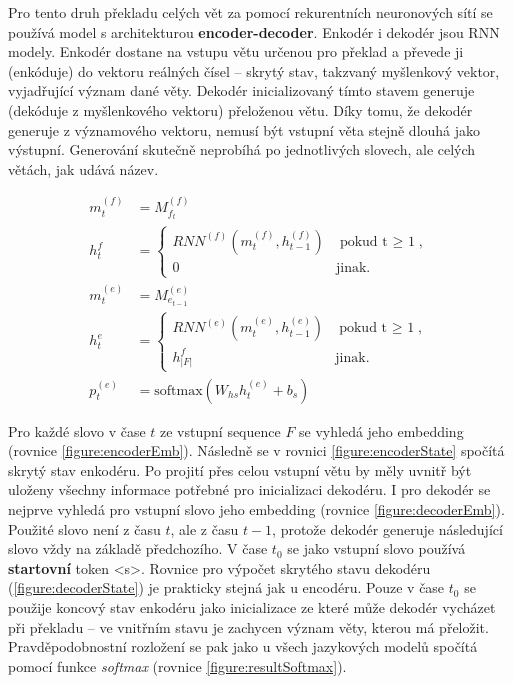 Pro tento druh překladu celých vět za pomocí rekurentních neuronových sítí se používá model s architekturou \textbf{encoder-decoder}. Enkodér i dekodér jsou RNN modely. Enkodér dostane na vstupu větu určenou pro překlad a převede ji (enkóduje) do vektoru reálných čísel -- skrytý stav, takzvaný myšlenkový vektor, vyjadřující význam dané věty. Dekodér inicializovaný tímto stavem generuje (dekóduje z myšlenkového vektoru) přeloženou větu. Díky tomu, že dekodér generuje z významového vektoru, nemusí být vstupní věta stejně dlouhá jako výstupní. Generování skutečně neprobíhá po jednotlivých slovech, ale celých větách, jak udává název.


\begin{align}
    m^{(f)}_{t}&=M^{(f)}_{f_t}\label{figure:encoderEmb} \\
    h^{f}_{t}&=\begin{cases}
                    RNN^{(f)}(m^{(f)}_{t},h^{(f)}_{t-1}) & \mbox{pokud t $\geq$ 1},\label{figure:encoderState} \\
                    0 & \mbox{jinak}.
                \end{cases}\\
    m^{(e)}_{t}&=M^{(e)}_{e_{t-1}}\label{figure:decoderEmb} \\
    h^{e}_{t}&=\begin{cases}
                    RNN^{(e)}(m^{(e)}_{t},h^{(e)}_{t-1}) & \mbox{pokud t $\geq$ 1},\\
                    h^{f}_{|F|} & \mbox{jinak}.
                \end{cases}\label{figure:decoderState} \\
    p^{(e)}_{t}&=\mbox{softmax}(W_{hs}h^{(e)}_{t} + b_{s}) \label{figure:resultSoftmax}
\end{align}


Pro každé slovo v čase $t$ ze vstupní sequence $F$ se vyhledá jeho embedding (rovnice \ref{figure:encoderEmb}). Následně se v rovnici \ref{figure:encoderState} spočítá skrytý stav enkodéru. Po projití přes celou vstupní větu by měly uvnitř být uloženy všechny informace potřebné pro inicializaci dekodéru. I pro dekodér se nejprve vyhledá pro vstupní slovo jeho embedding (rovnice \ref{figure:decoderEmb}). Použité slovo není z času $t$, ale z času $t-1$, protože dekodér generuje následující slovo vždy na základě předchozího. V čase $t_0$ se jako vstupní slovo používá \textbf{startovní} token <s>. Rovnice pro výpočet skrytého stavu dekodéru (\ref{figure:decoderState}) je prakticky stejná jak u encodéru. Pouze v čase $t_0$ se použije koncový stav enkodéru jako inicializace ze které může dekodér vycházet při překladu -- ve vnitřním stavu je zachycen význam věty, kterou má přeložit. Pravděpodobnostní rozložení se pak jako u všech jazykových modelů spočítá pomocí funkce \emph{softmax} (rovnice \ref{figure:resultSoftmax}).


